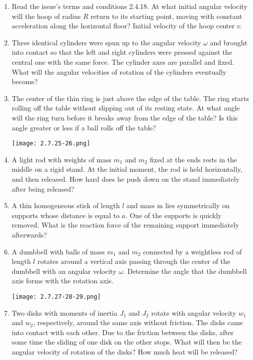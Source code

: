 \documentclass{article}
\begin{document}
\begin{enumerate}[label=2.7.\arabic*]
\item Read the issue's terms and conditions 2.4.18. At what initial angular velocity will the hoop of radius $R$ return to its starting point, moving with constant acceleration along the horizontal floor? Initial velocity of the hoop center $v$.

\item Three identical cylinders were spun up to the angular velocity $\omega$ and brought into contact so that the left and right cylinders were pressed against the central one with the same force. The cylinder axes are parallel and fixed. What will the angular velocities of rotation of the cylinders eventually become?

\item The center of the thin ring is just above the edge of the table. The ring starts rolling off the table without slipping out of its resting state. At what angle will the ring turn before it breaks away from the edge of the table? Is this angle greater or less if a ball rolls off the table?

\begin{center}
    \texttt{[image: 2.7.25-26.png]}
\end{center}

\item A light rod with weights of mass $m_1$ and $m_2$ fixed at the ends rests in the middle on a rigid stand. At the initial moment, the rod is held horizontally, and then released. How hard does he push down on the stand immediately after being released?

\item A thin homogeneous stick of length $l$ and mass m lies symmetrically on supports whose distance is equal to $a$. One of the supports is quickly removed. What is the reaction force of the remaining support immediately afterwards?

\item A dumbbell with balls of mass $m_1$ and $m_2$ connected by a weightless rod of length $l$ rotates around a vertical axis passing through the center of the dumbbell with an angular velocity $\omega$. Determine the angle that the dumbbell axis forms with the rotation axis.

\begin{center}
    \texttt{[image: 2.7.27-28-29.png]}
\end{center}

\item Two disks with moments of inertia $J_1$ and $J_2$ rotate with angular velocity $w_1$ and $w_2$, respectively, around the same axis without friction. The disks came into contact with each other. Due to the friction between the disks, after some time the sliding of one disk on the other stops. What will then be the angular velocity of rotation of the disks? How much heat will be released?


\end{enumerate}
\end{document}
